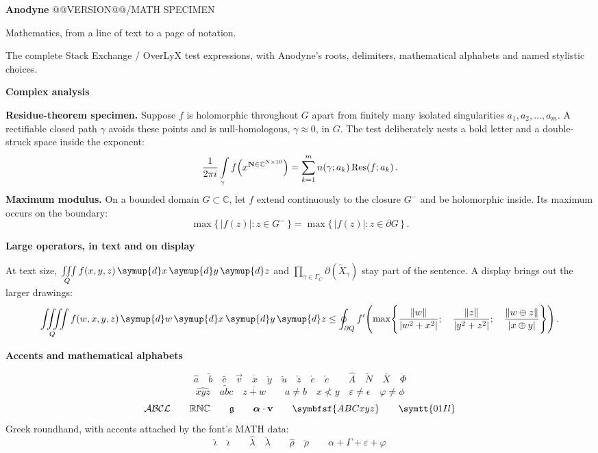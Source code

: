 \documentclass[border=22pt]{standalone}
\DeclareMathOperator\Res{Res}
\newcommand*\diff{\mathop{}\!\symup{d}}
\newcommand*\parttitle[2]{\par\vspace{13pt}{\color{rule}\hrule height .6pt}\vspace{9pt}
  {\color{accent}\fontsize{9}{12}\selectfont #1\quad}
  {\bfseries\fontsize{13}{16}\selectfont #2}\par\vspace{6pt}}
\begin{document}
\begin{minipage}{590pt}
\color{ink}\fontsize{11}{15}\selectfont
{\bfseries\fontsize{36}{40}\selectfont Anodyne}
\hfill {\color{muted}\fontsize{9}{12}\selectfont @@VERSION@@\quad /\quad MATH SPECIMEN}
\par\vspace{2pt}
{\fontsize{15}{19}\selectfont Mathematics, from a line of text to a page of notation.}
\par\vspace{3pt}
{\color{muted}The complete Stack Exchange / OverLyX test expressions, with Anodyne's roots,
delimiters, mathematical alphabets and named stylistic choices.}

\parttitle{01}{Complex analysis}
{\bfseries Residue-theorem specimen.}
Suppose $f$ is holomorphic throughout $G$ apart from finitely many isolated
singularities $a_1,a_2,\dots,a_m$. A rectifiable closed path $\gamma$ avoids
these points and is null-homologous, $\gamma\approx0$, in $G$. The test deliberately nests a bold
letter and a double-struck space inside the exponent:
\[
  \frac{1}{2\pi i}\int\limits_\gamma
  f\Bigl(x^{\mathbf{N}\in\mathbb{C}^{N\times10}}\Bigr)
  =\sum_{k=1}^{m}n(\gamma;a_k)\Res(f;a_k)\,.
\]
{\bfseries Maximum modulus.}
On a bounded domain $G\subset\mathbb{C}$, let $f$ extend continuously to the
closure $G^-$ and be holomorphic inside. Its maximum occurs on the boundary:
\[
  \max\{\,|f(z)|:z\in G^-\,\}
  =\max\{\,|f(z)|:z\in\partial G\,\}\,.
\]

\parttitle{02}{Large operators, in text and on display}
At text size,
$\iiint\limits_Q f(x,y,z)\diff x\diff y\diff z$
and $\prod_{\gamma\in\Gamma_{\bar C}}\partial(\tilde X_\gamma)$
stay part of the sentence. A display brings out the larger drawings:
\[
  \iiiint\limits_Q f(w,x,y,z)\diff w\diff x\diff y\diff z
  \leq\oint_{\partial Q}f'\Biggl(\max\Biggl\{
  \frac{\Vert w\Vert}{\vert w^2+x^2\vert};\quad
  \frac{\Vert z\Vert}{\vert y^2+z^2\vert};\quad
  \frac{\Vert w\oplus z\Vert}{\vert x\oplus y\vert}
  \Biggr\}\Biggr)\,.
\]

\parttitle{03}{Accents and mathematical alphabets}
\[
 \hat a\quad\tilde b\quad\bar c\quad\vec v\quad\dot x\quad\ddot y\quad
 \breve u\quad\check z\quad\acute e\quad\grave e\qquad
 \hat A\quad\tilde N\quad\bar X\quad\dot\Phi
\]
\[
 \widehat{xyz}\quad\widetilde{abc}\quad\overline{z+w}\qquad
 a\ne b\quad x\not<y\quad\varepsilon\ne\epsilon\quad\varphi\ne\phi
\]
\[
 \mathcal{ABCL}\qquad\mathbb{RNC}\qquad\mathfrak g\qquad
 \boldsymbol\alpha\cdot\mathbf v\qquad\symbfsf{ABCxyz}\qquad\symtt{01Il}
\]
{\color{muted}\fontsize{9}{12}\selectfont Greek roundhand, with accents attached by the font's MATH data:}
\begingroup{}
\[
 \hat\iota\quad\ddot\iota\qquad
 \hat\lambda\quad\ddot\lambda\qquad
 \hat\rho\quad\ddot\rho\qquad
 \alpha+\Gamma+\varepsilon+\varphi
\]
\endgroup


\end{minipage}
\end{document}
